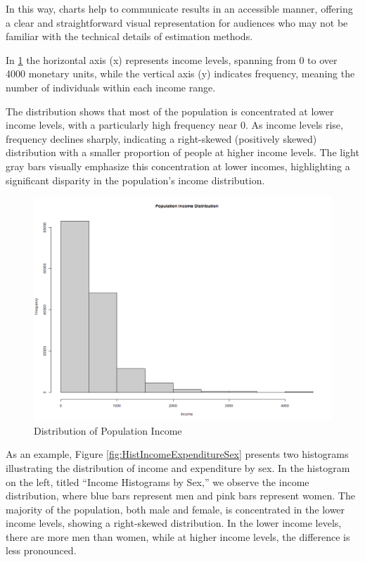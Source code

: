 \documentclass[
  12pt,
]{book}
\begin{document}
In this way, charts help to communicate results in an accessible manner, offering a clear and straightforward visual representation for audiences who may not be familiar with the technical details of estimation methods.

In \ref{fig:histIncome} the horizontal axis (x) represents income levels, spanning from 0 to over 4000 monetary units, while the vertical axis (y) indicates frequency, meaning the number of individuals within each income range.

The distribution shows that most of the population is concentrated at lower income levels, with a particularly high frequency near 0. As income levels rise, frequency declines sharply, indicating a right-skewed (positively skewed) distribution with a smaller proportion of people at higher income levels. The light gray bars visually emphasize this concentration at lower incomes, highlighting a significant disparity in the population's income distribution.

\begin{figure}
\includegraphics[width=14.22in]{www/05_graficas/01_hist_ingreso} \caption{Distribution of Population Income}\label{fig:histIncome}
\end{figure}

As an example, Figure \ref{fig:HistIncomeExpenditureSex} presents two histograms illustrating the distribution of income and expenditure by sex. In the histogram on the left, titled ``Income Histograms by Sex,'' we observe the income distribution, where blue bars represent men and pink bars represent women. The majority of the population, both male and female, is concentrated in the lower income levels, showing a right-skewed distribution. In the lower income levels, there are more men than women, while at higher income levels, the difference is less pronounced.
\end{document}
